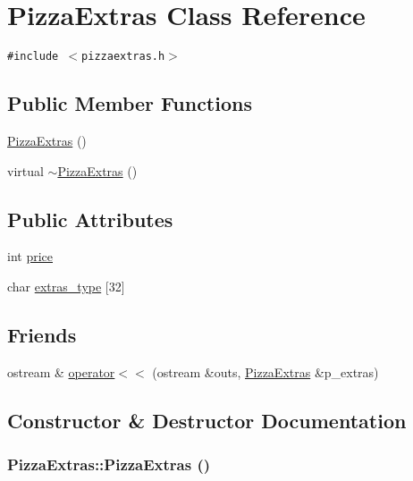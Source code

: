 \hypertarget{class_pizza_extras}{
\section{Pizza\-Extras Class Reference}
\label{class_pizza_extras}
}
{\tt \#include $<$pizzaextras.h$>$}

\subsection*{Public Member Functions}
\begin{CompactItemize}
\item 
\hyperlink{class_pizza_extras_cfcaf8c3af29be3ecfb28690adf46452}{Pizza\-Extras} ()
\item 
virtual \hyperlink{class_pizza_extras_d1b99435e0c475e0e058749ec6cd9ff6}{$\sim$Pizza\-Extras} ()
\end{CompactItemize}
\subsection*{Public Attributes}
\begin{CompactItemize}
\item 
int \hyperlink{class_pizza_extras_78a5eb43deef9a7b5b9ce157b9d52ac4}{price}
\item 
char \hyperlink{class_pizza_extras_22c51029f6700dc22d22c0f972ff904e}{extras\_\-type} \mbox{[}32\mbox{]}
\end{CompactItemize}
\subsection*{Friends}
\begin{CompactItemize}
\item 
ostream \& \hyperlink{class_pizza_extras_01be6c7f4cc0dae56b875e6179844126}{operator$<$$<$} (ostream \&outs, \hyperlink{class_pizza_extras}{Pizza\-Extras} \&p\_\-extras)
\end{CompactItemize}


\subsection{Constructor \& Destructor Documentation}
\hypertarget{class_pizza_extras_cfcaf8c3af29be3ecfb28690adf46452}{
\subsubsection[PizzaExtras]{\setlength{\rightskip}{0pt plus 5cm}Pizza\-Extras::Pizza\-Extras ()}}
\label{class_pizza_extras_cfcaf8c3af29be3ecfb28690adf46452}


